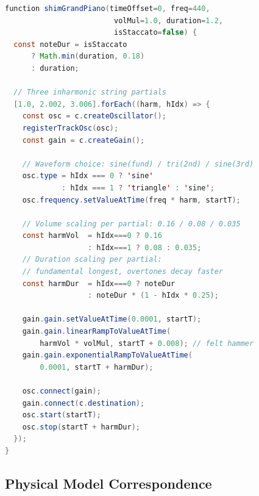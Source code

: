 \documentclass[10pt,journal,compsoc,twocolumn]{article}
\begin{document}
\begin{lstlisting}[language=Java,
    caption={\texttt{shimGrandPiano}: tri-harmonic string model (line 3659).},
    label={lst:piano}]
function shimGrandPiano(timeOffset=0, freq=440,
                         volMul=1.0, duration=1.2,
                         isStaccato=false) {
  const noteDur = isStaccato
      ? Math.min(duration, 0.18)
      : duration;

  // Three inharmonic string partials
  [1.0, 2.002, 3.006].forEach((harm, hIdx) => {
    const osc = c.createOscillator();
    registerTrackOsc(osc);
    const gain = c.createGain();

    // Waveform choice: sine(fund) / tri(2nd) / sine(3rd)
    osc.type = hIdx === 0 ? 'sine'
             : hIdx === 1 ? 'triangle' : 'sine';
    osc.frequency.setValueAtTime(freq * harm, startT);

    // Volume scaling per partial: 0.16 / 0.08 / 0.035
    const harmVol  = hIdx===0 ? 0.16
                   : hIdx===1 ? 0.08 : 0.035;
    // Duration scaling per partial:
    // fundamental longest, overtones decay faster
    const harmDur  = hIdx===0 ? noteDur
                   : noteDur * (1 - hIdx * 0.25);

    gain.gain.setValueAtTime(0.0001, startT);
    gain.gain.linearRampToValueAtTime(
        harmVol * volMul, startT + 0.008); // felt hammer
    gain.gain.exponentialRampToValueAtTime(
        0.0001, startT + harmDur);

    osc.connect(gain);
    gain.connect(c.destination);
    osc.start(startT);
    osc.stop(startT + harmDur);
  });
}
\end{lstlisting}

\subsection{Physical Model Correspondence}
\end{document}
